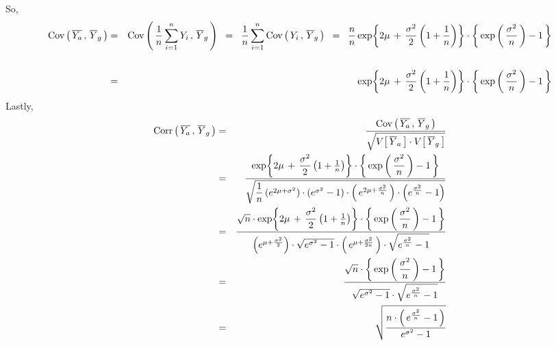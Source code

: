 So,
\begin{eqnarray*}
          \textnormal{Cov}\left(\,\overline{Y_{a}}\,,\,\overline{Y}_{g}\,\right)
&=&       \textnormal{Cov}\left(\,
          \dfrac{1}{n}\sum_{i=1}^{n}Y_{i}
          \,,\,
          \overline{Y}_{g}
          \,\right)
\;\;=\;\; \dfrac{1}{n}\sum_{i=1}^{n}
          \textnormal{Cov}\left(\,
          Y_{i}
          \,,\,
          \overline{Y}_{g}
          \,\right)
\;\;=\;\; \dfrac{n}{n}\exp\!\left\{
          2\mu \,+\,
          \dfrac{\sigma^{2}}{2}
          \left(1+\frac{1}{n}\right)
          \right\}
          \cdot
          \left\{\,\exp\left(\,\dfrac{\sigma^{2}}{n}\,\right)-1\,\right\} \\
\\
&=&       \exp\!\left\{
          2\mu \,+\,
          \dfrac{\sigma^{2}}{2}
          \left(1+\frac{1}{n}\right)
          \right\}
          \cdot
          \left\{\,\exp\left(\,\dfrac{\sigma^{2}}{n}\,\right)-1\,\right\} \\
\end{eqnarray*}
Lastly,
\begin{eqnarray*}
          \textnormal{Corr}\left(\,\overline{Y_{a}}\,,\,\overline{Y}_{g}\,\right)
&=&       \dfrac{\textnormal{Cov}\left(\,\overline{Y_{a}}\,,\,\overline{Y}_{g}\,\right)}
          {\sqrt{V\!\left[\,\overline{Y}_{a}\,\right]\cdot V\!\left[\,\overline{Y}_{g}\,\right]}}
\\
&=&       \dfrac{
          \exp\!\left\{
          2\mu \,+\,
          \dfrac{\sigma^{2}}{2}
          \left(1+\frac{1}{n}\right)
          \right\}
          \cdot
          \left\{\,\exp\left(\,\dfrac{\sigma^{2}}{n}\,\right)-1\,\right\}
          }{
          \sqrt{
          \dfrac{1}{n}\left(e^{2\mu+\sigma^{2}}\right)\cdot\left(e^{\sigma^{2}}-1\right)
          \cdot
          \left(\,e^{2\mu+\frac{\sigma^{2}}{n}}\,\right)
          \cdot
          \left(e^{\frac{\sigma^{2}}{n}} - 1\right)
          }
          }
\\
&=&       \dfrac{
          \sqrt{n}\cdot
          \exp\!\left\{
          2\mu \,+\,
          \dfrac{\sigma^{2}}{2}
          \left(1+\frac{1}{n}\right)
          \right\}
          \cdot
          \left\{\,\exp\left(\,\dfrac{\sigma^{2}}{n}\,\right)-1\,\right\}
          }{
          \left(e^{\mu+\frac{\sigma^{2}}{2}}\right)
          \cdot
          \sqrt{e^{\sigma^{2}}-1}
          \cdot
          \left(\,e^{\mu+\frac{\sigma^{2}}{2n}}\,\right)
          \cdot
          \sqrt{e^{\frac{\sigma^{2}}{n}} - 1}
          }
\\
&=&       \dfrac{
          \sqrt{n}\cdot\left\{\,\exp\left(\,\dfrac{\sigma^{2}}{n}\,\right)-1\,\right\}
          }{
          \sqrt{e^{\sigma^{2}}-1}
          \cdot
          \sqrt{e^{\frac{\sigma^{2}}{n}} - 1}
          }
\\
&=&       \sqrt{\dfrac{
          n\cdot
          \left(\,e^{\frac{\sigma^{2}}{n}}-1\,\right)
          }{
          e^{\sigma^{2}}-1
          }}
\\
\end{eqnarray*}


